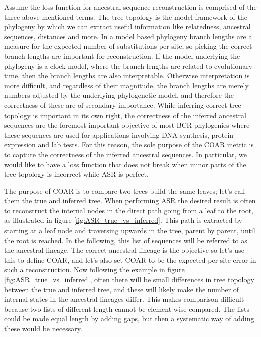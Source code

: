 Assume the loss function for ancestral sequence reconstruction is comprised of the three above mentioned terms.
The tree topology is the model framework of the phylogeny by which we can extract useful information like relatedness, ancestral sequences, distances and more.
In a model based phylogeny branch lengths are a measure for the expected number of substitutions per-site, so picking the correct branch lengths are important for reconstruction.
If the model underlying the phylogeny is a clock-model, where the branch lengths are related to evolutionary time, then the branch lengths are also interpretable.
Otherwise interpretation is more difficult, and regardless of their magnitude, the branch lengths are merely numbers adjusted by the underlying phylogenetic model, and therefore the correctness of these are of secondary importance.
While inferring correct tree topology is important in its own right, the correctness of the inferred ancestral sequences are the foremost important objective of most BCR phylogenies where these sequences are used for applications involving DNA synthesis, protein expression and lab tests.
For this reason, the sole purpose of the COAR metric is to capture the correctness of the inferred ancestral sequences.
In particular, we would like to have a loss function that does not break when minor parts of the tree topology is incorrect while ASR is perfect.

The purpose of COAR is to compare two trees build the same leaves; let's call them the true and inferred tree.
When performing ASR the desired result is often to reconstruct the internal nodes in the direct path going from a leaf to the root, as illustrated in figure \ref{fig:ASR_true_vs_inferred}.
This path is extracted by starting at a leaf node and traversing upwards in the tree, parent by parent, until the root is reached.
In the following, this list of sequences will be referred to as the ancestral lineage.
The correct ancestral lineage is the objective so let's use this to define COAR, and let's also set COAR to be the expected per-site error in such a reconstruction.
Now following the example in figure \ref{fig:ASR_true_vs_inferred}, often there will be small differences in tree topology between the true and inferred tree, and these will likely make the number of internal states in the ancestral lineages differ.
This makes comparison difficult because two lists of different length cannot be element-wise compared.
The lists could be made equal length by adding gaps, but then a systematic way of adding these would be necessary.

